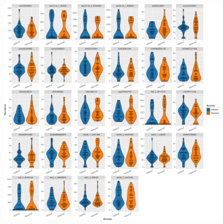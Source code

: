 \documentclass[
  letterpaper,
  DIV=11,
  numbers=noendperiod]{scrartcl}
\begin{document}
\begin{figure}[H]

{\centering \includegraphics{InformeNeiker_files/figure-pdf/unnamed-chunk-12-2.pdf}

}

\end{figure}
\end{document}
